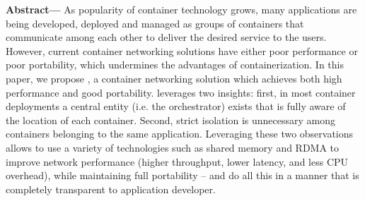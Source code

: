 \textbf{Abstract---} 
As popularity of container technology grows, many applications are being
developed, deployed and managed as groups of containers that communicate
among each other to deliver the desired service to the users.  However, current
container networking solutions have either poor performance or poor portability,
which undermines the advantages of containerization.  In this paper, we propose
\sysname, a container networking solution which achieves both high performance
and good portability. \sysname leverages two insights: first, in most container
deployments a central entity (i.e. the orchestrator) exists that is fully aware
of the location of each container. Second, strict isolation is unnecessary
among containers belonging to the same application. Leveraging these two
observations allows \sysname to use a variety of technologies such as shared
memory and RDMA to improve network performance (higher throughput, lower
latency, and less CPU overhead), while maintaining full portability -- and do
all this in a manner that is completely transparent to application developer.

